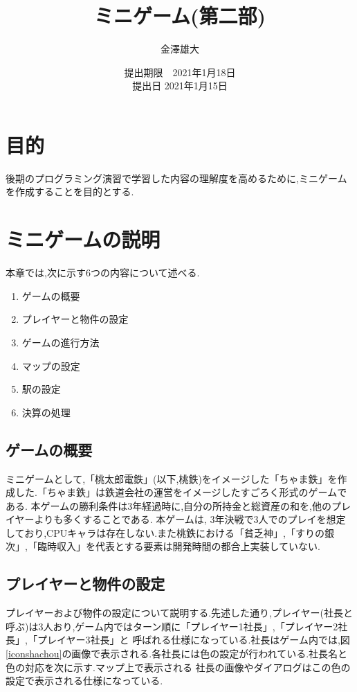 \documentclass[a4j]{jarticle}
\title{ミニゲーム(第二部)}
\date{提出期限　2021年1月18日 \\ 提出日 2021年1月15日}
\author{金澤雄大}
\begin{document}
    \maketitle
    \thispagestyle{empty}
    \clearpage
    \addtocounter{page}{-1}
    \section{目的}
    後期のプログラミング演習で学習した内容の理解度を高めるために,ミニゲームを作成することを目的とする.
    \section{ミニゲームの説明}
    本章では,次に示す6つの内容について述べる.
    \begin{enumerate}
        \item ゲームの概要
        \item プレイヤーと物件の設定
        \item ゲームの進行方法
        \item マップの設定
        \item 駅の設定
        \item 決算の処理
    \end{enumerate}    
    \subsection{ゲームの概要}
    ミニゲームとして,「桃太郎電鉄」\cite{mmtt}(以下,桃鉄)をイメージした「ちゃま鉄」を作成した.「ちゃま鉄」は鉄道会社の運営をイメージしたすごろく形式のゲームである.
    本ゲームの勝利条件は3年経過時に,自分の所持金と総資産の和を,他のプレイヤーよりも多くすることである.
    本ゲームは, 3年決戦で3人でのプレイを想定しており,CPUキャラは存在しない.また桃鉄における「貧乏神」,「すりの銀次」,「臨時収入」を代表とする要素は開発時間の都合上実装していない.

    \subsection{プレイヤーと物件の設定}
    プレイヤーおよび物件の設定について説明する.先述した通り,プレイヤー(社長と呼ぶ)は3人おり,ゲーム内ではターン順に「プレイヤー1社長」,「プレイヤー2社長」,「プレイヤー3社長」と
    呼ばれる仕様になっている.社長はゲーム内では,図\ref{iconshachou}の画像で表示される.各社長には色の設定が行われている.社長名と色の対応を次に示す.マップ上で表示される
    社長の画像やダイアログはこの色の設定で表示される仕様になっている.
\end{document}
